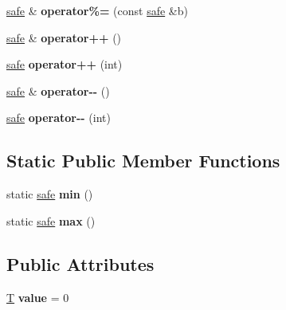 \begin{DoxyCompactItemize}
\item 
\mbox{\label{structfc_1_1safe_aa7cbd15964373b0131abf421074cbd71}} 
\mbox{\hyperlink{structfc_1_1safe}{safe}} \& {\bfseries operator\%=} (const \mbox{\hyperlink{structfc_1_1safe}{safe}} \&b)
\item 
\mbox{\label{structfc_1_1safe_af1c879152b3d86f7e30a706555268b2c}} 
\mbox{\hyperlink{structfc_1_1safe}{safe}} \& {\bfseries operator++} ()
\item 
\mbox{\label{structfc_1_1safe_afb19032269d97385e234e770939508b8}} 
\mbox{\hyperlink{structfc_1_1safe}{safe}} {\bfseries operator++} (int)
\item 
\mbox{\label{structfc_1_1safe_a05d910ac6feda1016cfa2f98edc0ee00}} 
\mbox{\hyperlink{structfc_1_1safe}{safe}} \& {\bfseries operator-\/-\/} ()
\item 
\mbox{\label{structfc_1_1safe_a9a4c3650a4eb50d58381a1b23d66ff8f}} 
\mbox{\hyperlink{structfc_1_1safe}{safe}} {\bfseries operator-\/-\/} (int)
\end{DoxyCompactItemize}
\subsection*{Static Public Member Functions}
\begin{DoxyCompactItemize}
\item 
\mbox{\label{structfc_1_1safe_aad93d34570bca85761a02833ef28fd16}} 
static \mbox{\hyperlink{structfc_1_1safe}{safe}} {\bfseries min} ()
\item 
\mbox{\label{structfc_1_1safe_affdc0faac8a4b7048ae164ff9304ef88}} 
static \mbox{\hyperlink{structfc_1_1safe}{safe}} {\bfseries max} ()
\end{DoxyCompactItemize}
\subsection*{Public Attributes}
\begin{DoxyCompactItemize}
\item 
\mbox{\label{structfc_1_1safe_a6bb99e2058adab1fef1f6b9df91006c9}} 
\mbox{\hyperlink{struct_t}{T}} {\bfseries value} = 0
\end{DoxyCompactItemize}
